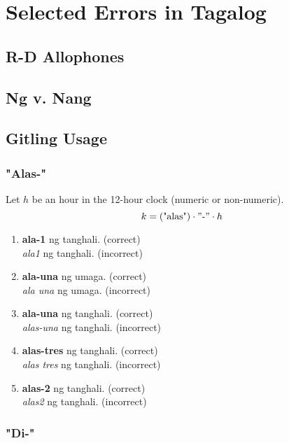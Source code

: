 \section{Selected Errors in Tagalog}
\subsection{R-D Allophones}
\subsection{Ng v. Nang}

\subsection{Gitling Usage}

\subsubsection{"Alas-"}
Let \(h\) be an hour in the 12-hour clock (numeric or non-numeric).
\[
      k = (\text{"alas"}) \cdot "\text{-}" \cdot h
\]
\begin{example}
\end{example}
\begin{enumerate}
      \item \textbf{ala-1} ng tanghali. (correct) \\
            \textit{ala1} ng tanghali. (incorrect)
      \item \textbf{ala-una} ng umaga. (correct) \\
            \textit{ala una} ng umaga. (incorrect)
      \item \textbf{ala-una} ng tanghali. (correct) \\
            \textit{alas-una} ng tanghali. (incorrect)
      \item \textbf{alas-tres} ng tanghali. (correct) \\
            \textit{alas tres} ng tanghali. (incorrect)
      \item \textbf{alas-2} ng tanghali. (correct) \\
            \textit{alas2} ng tanghali. (incorrect)
\end{enumerate}

\subsubsection{"Di-"}

